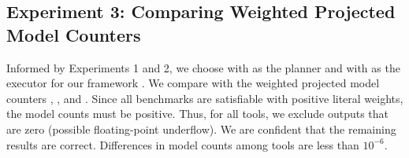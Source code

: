 
\subsection{Experiment 3: Comparing Weighted Projected Model Counters}

Informed by Experiments 1 and 2, we choose \Lg{} with \flowcutter{} as the planner and \dmc{} with \mcs{} as the executor for our framework \procount.
We compare \procount{} with the weighted projected model counters \dfp{}, \projmc{}, and \ssat{}.
Since all benchmarks are satisfiable
with positive literal weights, the model counts must be positive.
Thus, for all tools, we exclude outputs that are zero (possible floating-point underflow).
We are confident that the remaining results are correct.
Differences in model counts among tools are less than $10^{-6}$.

